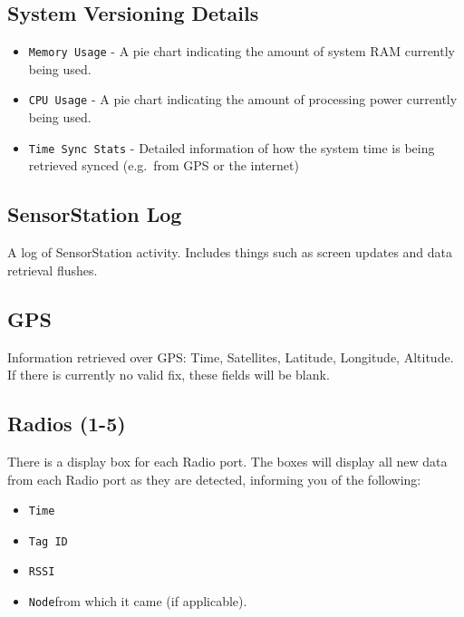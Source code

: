 \documentclass[
]{article}
\providecommand{\tightlist}{%
  \setlength{\itemsep}{0pt}\setlength{\parskip}{0pt}}
\begin{document}
\hypertarget{system-versioning-details}{%
\subsection{System Versioning Details}\label{system-versioning-details}}

\begin{itemize}
\tightlist
\item
  \texttt{Memory\ Usage} - A pie chart indicating the amount of system
  RAM currently being used.
\item
  \texttt{CPU\ Usage} - A pie chart indicating the amount of processing
  power currently being used.
\item
  \texttt{Time\ Sync\ Stats} - Detailed information of how the system
  time is being retrieved synced (e.g.~from GPS or the internet)
\end{itemize}

\hypertarget{sensorstation-log}{%
\subsection{SensorStation Log}\label{sensorstation-log}}

A log of SensorStation activity. Includes things such as screen updates
and data retrieval flushes.

\hypertarget{gps}{%
\subsection{GPS}\label{gps}}

Information retrieved over GPS: Time, Satellites, Latitude, Longitude,
Altitude. If there is currently no valid fix, these fields will be
blank.

\hypertarget{radios-1-5}{%
\subsection{Radios (1-5)}\label{radios-1-5}}

There is a display box for each Radio port. The boxes will display all
new data from each Radio port as they are detected, informing you of the
following:

\begin{itemize}
\tightlist
\item
  \texttt{Time}
\item
  \texttt{Tag\ ID}
\item
  \texttt{RSSI}
\item
  \texttt{Node}from which it came (if applicable).
\end{itemize}
\end{document}
